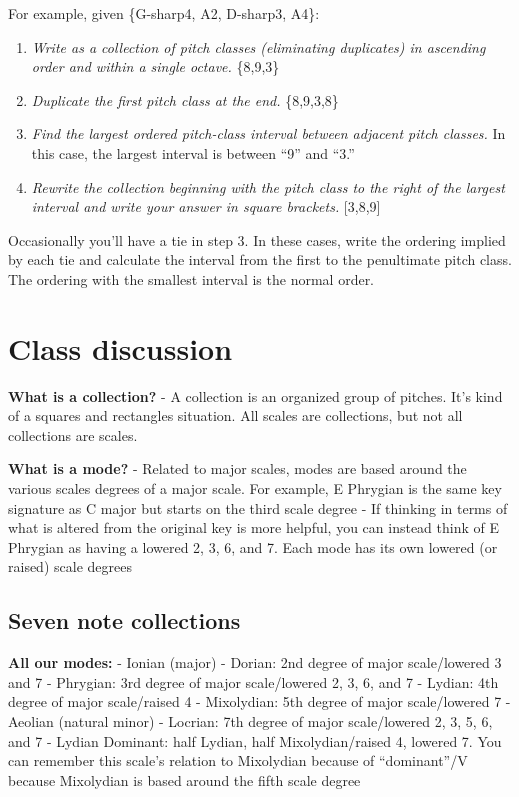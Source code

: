 \documentclass{book}
\providecommand{\tightlist}{%
  \setlength{\itemsep}{0pt}\setlength{\parskip}{0pt}}
\begin{document}
For example, given \{G-sharp4, A2, D-sharp3, A4\}:

\begin{enumerate}
\def\labelenumi{\arabic{enumi}.}
\tightlist
\item
  \emph{Write as a collection of pitch classes (eliminating duplicates) in
  ascending order and within a single octave.} \{8,9,3\}
\item
  \emph{Duplicate the first pitch class at the end.} \{8,9,3,8\}
\item
  \emph{Find the largest ordered pitch-class interval between adjacent pitch
  classes.} In this case, the largest interval is between ``9'' and ``3.''
\item
  \emph{Rewrite the collection beginning with the pitch class to the right of
  the largest interval and write your answer in square brackets.} {[}3,8,9{]}
\end{enumerate}

Occasionally you'll have a tie in step 3. In these cases, write the ordering
implied by each tie and calculate the interval from the first to the
penultimate pitch class. The ordering with the smallest interval is the normal
order.

\hypertarget{class-discussion-20}{%
\chapter{Class discussion}\label{class-discussion-20}}

\textbf{What is a collection?} - A collection is an organized group of
pitches. It's kind of a squares and rectangles situation. All scales are
collections, but not all collections are scales.

\textbf{What is a mode?} - Related to major scales, modes are based around the
various scales degrees of a major scale. For example, E Phrygian is the same
key signature as C major but starts on the third scale degree - If thinking in
terms of what is altered from the original key is more helpful, you can
instead think of E Phrygian as having a lowered 2, 3, 6, and 7. Each mode has
its own lowered (or raised) scale degrees

\hypertarget{seven-note-collections}{%
\section{Seven note collections}\label{seven-note-collections}}

\textbf{All our modes:} - Ionian (major) - Dorian: 2nd degree of major
scale/lowered 3 and 7 - Phrygian: 3rd degree of major scale/lowered 2, 3, 6,
and 7 - Lydian: 4th degree of major scale/raised 4 - Mixolydian: 5th degree of
major scale/lowered 7 - Aeolian (natural minor) - Locrian: 7th degree of major
scale/lowered 2, 3, 5, 6, and 7 - Lydian Dominant: half Lydian, half
Mixolydian/raised 4, lowered 7. You can remember this scale's relation to
Mixolydian because of ``dominant''/V because Mixolydian is based around the
fifth scale degree
\end{document}
